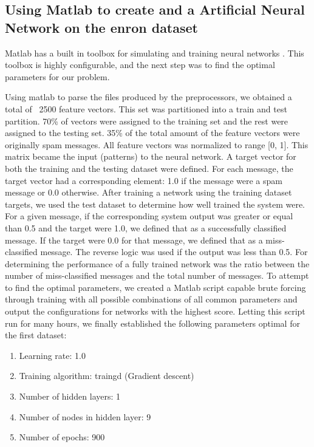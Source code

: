     \subsection
      {
        Using Matlab to create and a Artificial Neural Network on the
        enron dataset
      }
    
    Matlab has a built in toolbox for simulating and training neural networks
    \cite{matlab-nn}. 
    This toolbox is highly configurable, and the next step was to find the
    optimal parameters for our problem.
    
    Using matlab to parse the files produced by the preprocessors, we obtained
    a total of ~2500 feature vectors. This set was partitioned into a train and
    test partition. 70\% of vectors were assigned to the training set and the
    rest were assigned to the testing set. 35\% of the total amount of the
    feature vectors were originally spam messages. All feature vectors was
    normalized to range [0, 1]. This matrix became the input (patterns) to the
    neural network. A target vector for both the training and the testing
    dataset were defined. For each message, the target vector had a
    corresponding element: 1.0 if the message were a spam message or 0.0
    otherwise. 
    After training a network using the training dataset targets, we used the
    test dataset to determine how well trained the system were. 
    For a given message, if the corresponding system output was greater or
    equal than 0.5 and the target were 1.0, we defined that as a successfully
    classified message. If the target were 0.0 for that message, we defined
    that as a miss-classified message. The reverse logic was used if the output
    was less than 0.5.
    For determining the performance of a fully trained network was the ratio
    between the number of miss-classified messages and the total number of
    messages.
    To attempt to find the optimal parameters, we created a Matlab script
    capable brute forcing through training with all possible combinations of
    all common parameters and output the configurations for networks with the
    highest score.  Letting this script run for many hours, we finally
    established the following parameters optimal for the first dataset:
    \begin{enumerate}
      \item Learning rate: 1.0
      \item Training algorithm: traingd (Gradient descent)
      \item Number of hidden layers: 1
      \item Number of nodes in hidden layer: 9
      \item Number of epochs: 900
    \end{enumerate}
